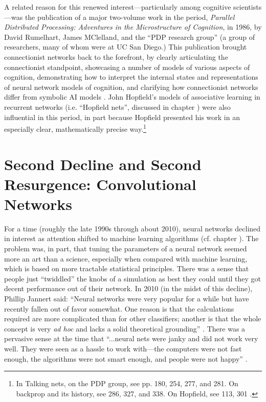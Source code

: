 
A related reason for this renewed interest---particularly among cognitive scientists---was the publication of a major two-volume work in the period, {\em Parallel Distributed Processing: Adventures in the Microstructure of Cognition}, in 1986, by David Rumelhart, James MClelland, and the ``PDP research group'' (a group of researchers, many of whom were at UC San Diego.)  This publication brought connectionist networks back to the forefront, by clearly articulating the connectionist standpoint, showcasing a number of models of various aspects of cognition, demonstrating how to interpret the internal states and representations of neural network models of cognition, and clarifying how connectionist networks differ from symbolic AI models \cite{rumelhart1986parallel}. John Hopfield's models of associative learning in recurrent networks (i.e. ``Hopfield nets'', discussed in chapter ) were also influential in this period, in part because Hopfield presented his work in an especially clear, mathematically precise way.\cite{hopfield1982neural}\footnote{In Talking nets, on the PDP group, see pp. 180, 254, 277, and 281. On  backprop and its history, see 286, 327, and 338. On Hopfield, see 113, 301 \cite{anderson2000talking}.}


\section{Second Decline and Second Resurgence: Convolutional Networks}\label{deep_revolution}

For a time (roughly the late 1990s through about 2010), neural networks declined in interest as attention shifted to machine learning algorithms (cf. chapter ). The problem was, in part, that tuning the parameters of a neural network seemed more an art than a science, especially when compared with machine learning, which is based on more tractable statistical principles. There was a sense that people just ``twiddled''  the knobs of a simulation as best they could until they got decent performance out of their network. In 2010 (in the midst of this decline), Phillip Jannert said: ``Neural networks were very popular for a while but have recently fallen out of favor somewhat. One reason is that the calculations required are more complicated than for other classifiers; another is that the whole concept is very \emph{ad hoc} and lacks a solid theoretical grounding'' \cite[Ch. 18]{janert2010data}.  There was a pervasive sense at the time that ``...neural nets were janky and did not work very well. They were seen as a hassle to work with---the computers were not fast enough, the algorithms were not smart enough, and people were not happy'' \cite{kurenkov2020briefhistory}.

